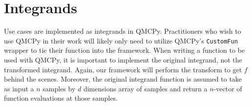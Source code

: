 \documentclass[graybox,footinfo]{svmult}
\begin{document}
\section{Integrands}

Use cases are implemented as integrands in QMCPy. Practitioners who wish to use QMCPy in their work will likely only need to utilize QMCPy's \texttt{CustomFun} wrapper to tie their function into the framework. When writing a function to be used with QMCPy, it is important to implement the original integrand, not the transformed integrand. Again, our framework will perform the transform to get $f$ behind the scenes. Moreover, the original integrand function is assumed to take as input a $n$ samples by $d$ dimensions array of samples and return a $n$-vector of function evaluations at those samples. 
\end{document}
